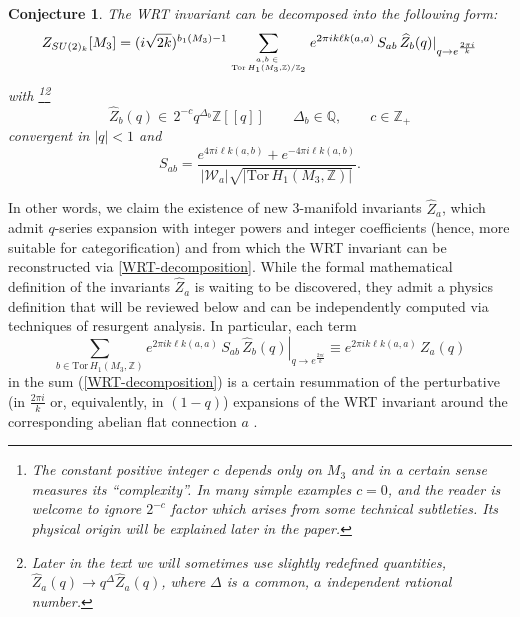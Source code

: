 \documentclass[hyper,letterpaper]{JHEP3}
\newcommand{\Z}{{\mathbb Z}}
\newcommand{\Q}{{\mathbb Q}}
\renewcommand{\hat}{\widehat}
\def\CW{{\mathcal W}}
\def\lk{{\ell k}}
\def\Tor{{\mathrm{Tor}\,}}
\newtheorem{conj}{Conjecture}[section]
\begin{document}
\begin{conj}
The WRT invariant can be decomposed into the following form:
\begin{equation}
	Z_{SU(2)_k}[M_3]=(i\sqrt{2k})^{b_1(M_3)-1}\sum_{a,b\;\in \;\atop\Tor H_1(M_3,\Z)/\Z_2}e^{2\pi ik\lk(a,a)}\,S_{ab}
	\, \hat{Z}_b(q)|_{q\rightarrow e^{\frac{2\pi i }{k}}}
	\label{WRT-decomposition}
\end{equation}
with%
\footnote{The constant positive integer $c$ depends only on $M_3$ and in a certain sense measures its ``complexity''. In many simple examples $c=0$, and the reader is welcome to ignore $2^{-c}$ factor which arises from some technical subtleties. Its physical origin will be explained later in the paper.}\footnote{Later in the text we will sometimes use slightly redefined quantities, $\hat{Z}_a(q)\rightarrow q^{\Delta}\hat{Z}_a(q)$, where $\Delta$ is a common, $a$ independent rational number.}
\begin{equation}
	\hat{Z}_b(q) \in \, 2^{-c} q^{\Delta_b} \Z[[q]]\qquad \Delta_b\in \Q,\qquad c\in\Z_+
	\label{Block-qSeries}
\end{equation}
convergent in $|q|<1$ and
\begin{equation}
	S_{ab}=\frac{e^{4\pi i\lk(a,b)}+e^{-4\pi i\lk(a,b)}}{|\CW_a|\sqrt{|\Tor H_1(M_3,\Z)|}}.
\end{equation}
\label{Conjecture1}
\end{conj}
In other words, we claim the existence of new 3-manifold invariants $\hat{Z}_a$, which admit $q$-series
expansion with integer powers and integer coefficients (hence, more suitable for categorification)
and from which the WRT invariant can be reconstructed via \eqref{WRT-decomposition}.
While the formal mathematical definition of the invariants $\hat{Z}_a$ is waiting to be discovered,
they admit a physics definition that will be reviewed below and
can be independently computed via techniques of resurgent analysis.
In particular, each term
\begin{equation}
	\sum_{b\in\Tor H_1(M_3,\Z)}\left.e^{2\pi ik\lk(a,a)}\,S_{ab}
		\, \hat{Z}_b(q)\right|_{q\rightarrow e^{\frac{2\pi i }{k}}}
		\equiv
			e^{2\pi ik\lk(a,a)}\,Z_a(q)
\label{WRT-ab-contrib}
\end{equation}
in the sum (\ref{WRT-decomposition}) is a certain resummation of the perturbative (in $\frac{2\pi i}k$ or, equivalently, in $(1-q)$) expansions of the WRT invariant around the corresponding abelian flat connection $a$ \cite{Gukov:2016njj}.
\end{document}
